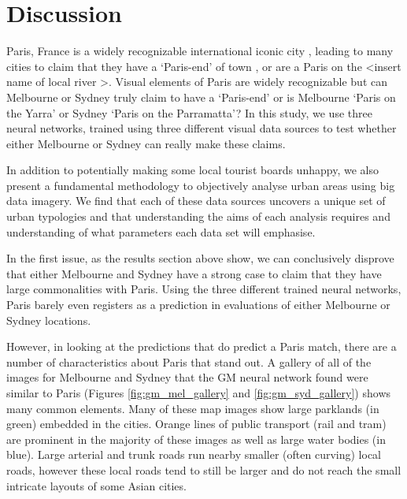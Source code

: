 \documentclass[sageh,times]{sagej}
\begin{document}
\section{Discussion}\label{sec:discussion}
Paris, France is a widely recognizable international iconic city \citep{Anholt2006}, leading to many cities to claim that they have a `Paris-end' of town \citep{Williams2010}, or are a Paris on the \textless insert name of local river \textgreater \citep{Wilden2013}. Visual elements of Paris are widely recognizable \citep{Doersch2012} but can Melbourne or Sydney truly claim to have a `Paris-end' or is Melbourne `Paris on the Yarra' or Sydney `Paris on the Parramatta'? In this study, we use three neural networks, trained using three different visual data sources to test whether either Melbourne or Sydney can really make these claims. 

In addition to potentially making some local tourist boards unhappy, we also present a fundamental methodology to objectively analyse urban areas using big data imagery. We find that each of these data sources uncovers a unique set of urban typologies and that understanding the aims of each analysis requires and understanding of what parameters each data set will emphasise.

In the first issue, as the results section above show, we can conclusively disprove that either Melbourne and Sydney have a strong case to claim that they have large commonalities with Paris. Using the three different trained neural networks, Paris barely even registers as a prediction in evaluations of either Melbourne or Sydney locations. 

However, in looking at the predictions that do predict a Paris match, there are a number of characteristics about Paris that stand out. A gallery of all of the images for Melbourne and Sydney that the GM neural network found were similar to Paris (Figures \ref{fig:gm_mel_gallery} and \ref{fig:gm_syd_gallery}) shows many common elements. Many of these map images show large parklands (in green) embedded in the cities. Orange lines of public transport (rail and tram) are prominent in the majority of these images as well as large water bodies (in blue). Large arterial and trunk roads run nearby smaller (often curving) local roads, however these local roads tend to still be larger and do not reach the small intricate layouts of some Asian cities.
\end{document}
